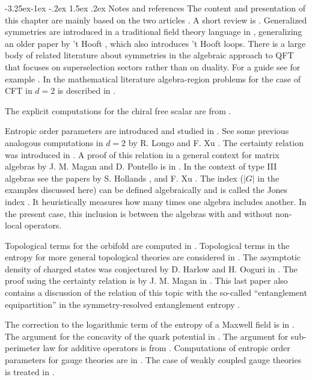 \documentclass[11pt]{article}
\makeatletter
\renewcommand\subsection{\@startsection{subsection}{2}{\z@}%
                                   {-3.25ex\@plus -1ex \@minus -.2ex}%
                                     {1.5ex \@plus .2ex}%
                                     {\normalfont\bfseries}}
\numberwithin{equation}{section}
\makeatother
\begin{document}
\subsection{Notes and references}
The content and presentation of this chapter are mainly based on the two articles \cite{casini2020entanglement,Casini:2020rgj}. A short review is \cite{Casini:2021zgr}. Generalized symmetries are introduced in a traditional field theory language in \cite{aharony2013reading}, generalizing an older paper by 't Hooft \cite{tHooft:1977nqb}, which also introduces 't Hooft loops.  There is a large body of related literature about symmetries in the algebraic approach to QFT that focuses on superselection sectors rather than on duality. For a guide see for example \cite{Haag:1992hx}. In the mathematical literature algebra-region problems for the case of CFT in $d=2$ is described in \cite{brunetti1993modular}.

The explicit computations for the chiral free scalar are from \cite{Arias:2018tmw}.

Entropic order parameters are introduced and studied in \cite{casini2020entanglement,Casini:2020rgj}. See some previous analogous computations in $d=2$ by R. Longo and F. Xu \cite{Longo:2017mbg}.  The certainty relation was introduced in \cite{casini2020entanglement}. A proof of this relation in a  general context for matrix algebras by J. M. Magan and D. Pontello is in \cite{magan2021quantum}. In the context of type III algebras see the papers by S. Hollands \cite{hollands2020variational}, and F. Xu \cite{xu2020relative}. The index ($|G|$ in the examples discussed here) can be defined algebraically and is called the Jones index \cite{Jones1983,KOSAKI1986123,cmp/1104179850}. It heuristically measures how many times one algebra includes another. In the present case, this inclusion is between the algebras with and without non-local operators.
    
 Topological terms for the orbifold are computed in \cite{casini2020entanglement}. Topological terms in the entropy for more general topological theories are considered in \cite{Kitaev:2005dm,Levin:2006zz}.  The asymptotic density of charged states was conjectured by D. Harlow and H. Ooguri in \cite{Harlow:2021trr}. The proof using the certainty relation is by J. M. Magan in \cite{Magan:2021myk}. This last paper also contains a discussion of the relation of this topic with the so-called ``entanglement equipartition'' in the symmetry-resolved entanglement entropy \cite{PhysRevB.98.041106,Murciano:2020vgh}. 
 
 The correction to the logarithmic term of the entropy of a Maxwell field is in \cite{casini2020logarithmic}. The argument for the concavity of the quark potential in \cite{bachas1986concavity}. The argument for sub-perimeter law for additive operators is from \cite{Casini:2020rgj}. 
Computations of entropic order parameters for gauge theories are in \cite{Casini:2020rgj}. The case of weakly coupled gauge theories is treated in \cite{Casini:2021tax}.
\newpage



{}

\end{document}
